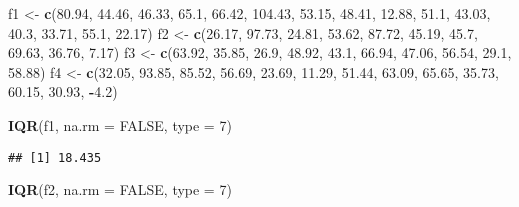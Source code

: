 \documentclass[
]{article}
\newenvironment{Shaded}{\begin{snugshade}}{\end{snugshade}}
\newcommand{\AttributeTok}[1]{\textcolor[rgb]{0.13,0.29,0.53}{#1}}
\newcommand{\ConstantTok}[1]{\textcolor[rgb]{0.56,0.35,0.01}{#1}}
\newcommand{\DecValTok}[1]{\textcolor[rgb]{0.00,0.00,0.81}{#1}}
\newcommand{\FloatTok}[1]{\textcolor[rgb]{0.00,0.00,0.81}{#1}}
\newcommand{\FunctionTok}[1]{\textcolor[rgb]{0.13,0.29,0.53}{\textbf{#1}}}
\newcommand{\NormalTok}[1]{#1}
\newcommand{\OtherTok}[1]{\textcolor[rgb]{0.56,0.35,0.01}{#1}}
\newcommand{\SpecialCharTok}[1]{\textcolor[rgb]{0.81,0.36,0.00}{\textbf{#1}}}
\begin{document}
\begin{Shaded}
\begin{Highlighting}[]
\NormalTok{f1 }\OtherTok{\textless{}{-}} \FunctionTok{c}\NormalTok{(}\FloatTok{80.94}\NormalTok{, }\FloatTok{44.46}\NormalTok{, }\FloatTok{46.33}\NormalTok{, }\FloatTok{65.1}\NormalTok{, }\FloatTok{66.42}\NormalTok{, }\FloatTok{104.43}\NormalTok{, }\FloatTok{53.15}\NormalTok{, }\FloatTok{48.41}\NormalTok{, }\FloatTok{12.88}\NormalTok{, }\FloatTok{51.1}\NormalTok{, }\FloatTok{43.03}\NormalTok{, }\FloatTok{40.3}\NormalTok{, }\FloatTok{33.71}\NormalTok{, }\FloatTok{55.1}\NormalTok{, }\FloatTok{22.17}\NormalTok{)}
\NormalTok{f2 }\OtherTok{\textless{}{-}} \FunctionTok{c}\NormalTok{(}\FloatTok{26.17}\NormalTok{, }\FloatTok{97.73}\NormalTok{, }\FloatTok{24.81}\NormalTok{, }\FloatTok{53.62}\NormalTok{, }\FloatTok{87.72}\NormalTok{, }\FloatTok{45.19}\NormalTok{, }\FloatTok{45.7}\NormalTok{, }\FloatTok{69.63}\NormalTok{, }\FloatTok{36.76}\NormalTok{, }\FloatTok{7.17}\NormalTok{)}
\NormalTok{f3 }\OtherTok{\textless{}{-}} \FunctionTok{c}\NormalTok{(}\FloatTok{63.92}\NormalTok{, }\FloatTok{35.85}\NormalTok{, }\FloatTok{26.9}\NormalTok{, }\FloatTok{48.92}\NormalTok{, }\FloatTok{43.1}\NormalTok{, }\FloatTok{66.94}\NormalTok{, }\FloatTok{47.06}\NormalTok{, }\FloatTok{56.54}\NormalTok{, }\FloatTok{29.1}\NormalTok{, }\FloatTok{58.88}\NormalTok{)}
\NormalTok{f4 }\OtherTok{\textless{}{-}} \FunctionTok{c}\NormalTok{(}\FloatTok{32.05}\NormalTok{, }\FloatTok{93.85}\NormalTok{, }\FloatTok{85.52}\NormalTok{, }\FloatTok{56.69}\NormalTok{, }\FloatTok{23.69}\NormalTok{, }\FloatTok{11.29}\NormalTok{, }\FloatTok{51.44}\NormalTok{, }\FloatTok{63.09}\NormalTok{, }\FloatTok{65.65}\NormalTok{, }\FloatTok{35.73}\NormalTok{, }\FloatTok{60.15}\NormalTok{, }\FloatTok{30.93}\NormalTok{, }\SpecialCharTok{{-}}\FloatTok{4.2}\NormalTok{)}

\FunctionTok{IQR}\NormalTok{(f1, }\AttributeTok{na.rm =} \ConstantTok{FALSE}\NormalTok{, }\AttributeTok{type =} \DecValTok{7}\NormalTok{)}
\end{Highlighting}
\end{Shaded}

\begin{verbatim}
## [1] 18.435
\end{verbatim}

\begin{Shaded}
\begin{Highlighting}[]
\FunctionTok{IQR}\NormalTok{(f2, }\AttributeTok{na.rm =} \ConstantTok{FALSE}\NormalTok{, }\AttributeTok{type =} \DecValTok{7}\NormalTok{)}
\end{Highlighting}
\end{Shaded}
\end{document}
